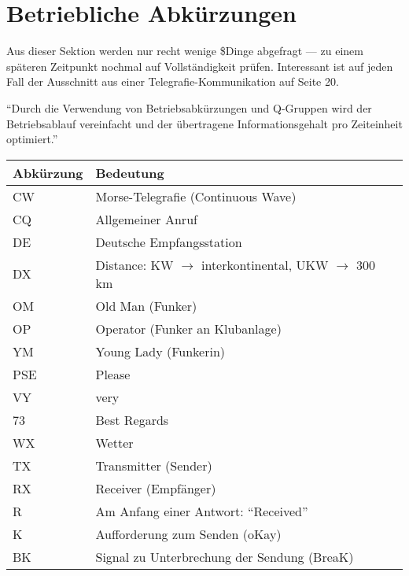 \documentclass[11pt,BCOR=8.5mm]{scrartcl}
\begin{document}
\section{Betriebliche Abkürzungen}
Aus dieser Sektion werden nur recht wenige \$Dinge abgefragt --- zu
einem späteren Zeitpunkt nochmal auf Vollständigkeit prüfen. Interessant
ist auf jeden Fall der Ausschnitt aus einer Telegrafie-Kommunikation auf
Seite 20.

"`Durch die Verwendung von Betriebsabkürzungen und Q-Gruppen wird der
Betriebsablauf vereinfacht und der übertragene Informationsgehalt pro
Zeiteinheit optimiert."'

\begin{table}[h]
  \centering
  \begin{tabular}{| l | l | }
  \hline
  Abkürzung & Bedeutung \\
  \hline
  \hline
  CW & Morse-Telegrafie (Continuous Wave) \\
  \hline
  CQ & Allgemeiner Anruf \\
  \hline
  DE & Deutsche Empfangsstation \\
  \hline
  DX & Distance: KW $\rightarrow$ interkontinental, UKW $\rightarrow$ 
	  300 km \\
  \hline
  OM & Old Man (Funker) \\
  \hline
  OP & Operator (Funker an Klubanlage) \\
  \hline
  YM & Young Lady (Funkerin) \\
  \hline
  PSE & Please \\
  \hline
  VY & very \\
  \hline
  73 & Best Regards \\
  \hline
  WX & Wetter \\
  \hline
  TX & Transmitter (Sender) \\
  \hline
  RX & Receiver (Empfänger) \\
  \hline
  R & Am Anfang einer Antwort: "`Received"' \\
  \hline
  K & Aufforderung zum Senden (oKay) \\
  \hline
  BK & Signal zu Unterbrechung der Sendung (BreaK) \\
  \hline
\end{tabular}
\end{table}
 
\end{document}
